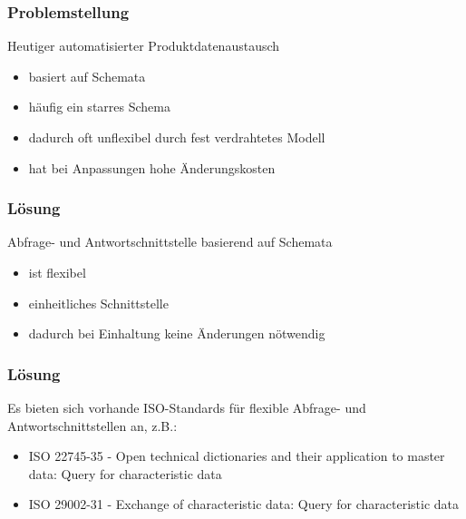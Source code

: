 \documentclass[serif,mathserif]{beamer}
\begin{document}
\begin{frame}
  \frametitle{Problemstellung}
  Heutiger automatisierter Produktdatenaustausch
  \begin{itemize}
  \item basiert auf Schemata
  \item häufig ein starres Schema
  \item dadurch oft unflexibel durch fest verdrahtetes Modell 
  \item hat bei Anpassungen hohe Änderungskosten
  \end{itemize}
\end{frame}


\begin{frame}
  \frametitle{Lösung}
  Abfrage- und Antwortschnittstelle basierend auf Schemata
  \begin{itemize}
  \item ist flexibel
  \item einheitliches Schnittstelle
  \item dadurch bei Einhaltung keine Änderungen nötwendig
  \end{itemize}
\end{frame}

\begin{frame}
  \frametitle{Lösung}
  Es bieten sich vorhande ISO-Standards für flexible Abfrage- und Antwortschnittstellen an, z.B.:
  \begin{itemize}
  \item ISO 22745-35 - Open technical dictionaries and their application to master data: Query for characteristic data
  \item ISO 29002-31 - Exchange of characteristic data: Query for characteristic data
  \end{itemize}
\end{frame}
\end{document}
